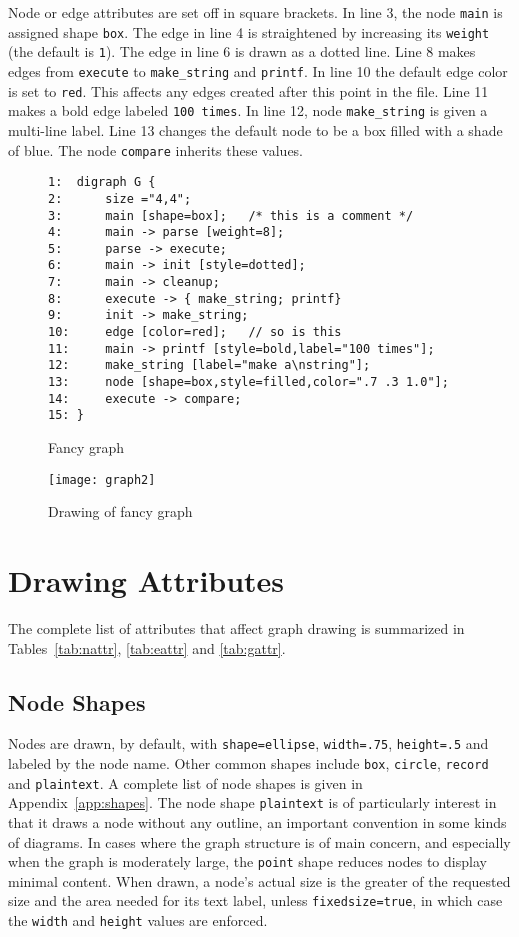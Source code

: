 \documentclass[11pt]{article}
\begin{document}
Node or edge attributes are set off in square brackets.
In line 3, the node \verb"main" is assigned shape \verb"box".
The edge in line 4 is straightened by increasing its 
\verb"weight" (the default is \verb"1").
The edge in line 6 is drawn as a dotted line.
Line 8 makes edges from {\tt execute} to {\tt make\_string} and {\tt printf}.
In line 10 the default edge color is set to \verb"red".
This affects any edges created after this point in the file.
Line 11 makes a bold edge labeled {\tt 100 times}.
In line 12, node \verb"make_string" is given a multi-line label.
Line 13 changes the default node to be a box filled with a shade of blue.
The node {\tt compare} inherits these values.

\begin{figure}[p]
\begin{verbatim}
1:  digraph G {
2:      size ="4,4";
3:      main [shape=box];   /* this is a comment */
4:      main -> parse [weight=8];
5:      parse -> execute;
6:      main -> init [style=dotted];
7:      main -> cleanup;
8:      execute -> { make_string; printf}
9:      init -> make_string;
10:     edge [color=red];   // so is this
11:     main -> printf [style=bold,label="100 times"];
12:     make_string [label="make a\nstring"];
13:     node [shape=box,style=filled,color=".7 .3 1.0"];
14:     execute -> compare;
15: }
\end{verbatim}
\caption{Fancy graph}
\label{fig:graph2}
\end{figure}

\begin{figure}[p]
	\centerline {
		\texttt{[image: graph2]}
	}
    \caption{Drawing of fancy graph}
    \label{fig:drawing2}
\end{figure}

\section{Drawing Attributes}

The complete list of attributes that affect graph drawing
is summarized in Tables~\ref{tab:nattr}, \ref{tab:eattr} and \ref{tab:gattr}.

\subsection{Node Shapes}
\label{sect:shape}

Nodes are drawn, by default, with {\tt shape=ellipse}, {\tt width=.75},
{\tt height=.5} and labeled by the node name.
Other common shapes include {\tt box}, {\tt circle}, {\tt record} 
and {\tt plaintext}.
A complete list of node shapes is given in Appendix~\ref{app:shapes}.
The node shape {\tt plaintext} is of particularly interest in
that it draws a node without any outline, an important convention
in some kinds of diagrams. In cases where the graph structure is of
main concern, and especially when the graph is moderately large, the
{\tt point} shape reduces nodes to display minimal content.
When drawn, a node's actual size is the greater of the requested
size and the area needed for its text label, unless {\tt fixedsize=true},
in which case the {\tt width} and {\tt height} values are enforced.
\end{document}
